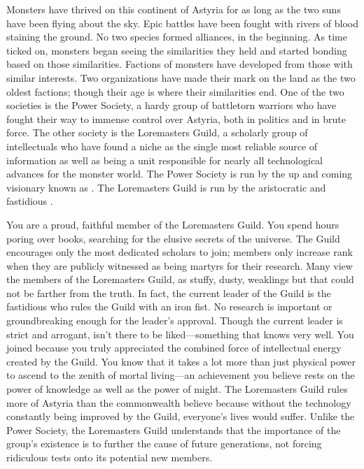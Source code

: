 \documentclass[blue]{guildcamp2}
\begin{document}
\name{\bLoremasters{}}



Monsters have thrived on this continent of Astyria for as long as the two suns have been flying about the sky. Epic battles have been fought with rivers of blood staining the ground. No two species formed alliances, in the beginning. As time ticked on, monsters began seeing the similarities they held and started bonding based on those similarities. Factions of monsters have developed from those with similar interests. Two organizations have made their mark on the land as the two oldest factions; though their age is where their similarities end. One of the two societies is the Power Society, a hardy group of battletorn warriors who have fought their way to immense control over Astyria, both in politics and in brute force. The other society is the Loremasters Guild, a scholarly group of intellectuals who have found a niche as the single most reliable source of information as well as being a unit responsible for nearly all technological advances for the monster world. The Power Society is run by the up and coming visionary known as \cRed{}. The Loremasters Guild is run by the aristocratic and fastidious \cVampire{\full}.

You are a proud, faithful member of the Loremasters Guild. You spend hours poring over books, searching for the elusive secrets of the universe. The Guild encourages only the most dedicated scholars to join; members only increase rank when they are publicly witnessed as being martyrs for their research. Many view the members of the Loremasters Guild, as stuffy, dusty, weaklings but that could not be farther from the truth. In fact, the current leader of the Guild is the fastidious \cVampire{\full} who rules the Guild with an iron fist. No research is important or groundbreaking enough for the leader's approval. Though the current leader is strict and arrogant, \cVampire{\they} isn't there to be liked---something that \cVampire{\they} knows very well. You joined because you truly appreciated the combined force of intellectual energy created by the Guild. You know that it takes a lot more than just physical power to ascend to the zenith of mortal living---an achievement you believe rests on the power of knowledge as well as the power of might. The Loremasters Guild rules more of Astyria than the commonwealth believe because without the technology constantly being improved by the Guild, everyone's lives would suffer. Unlike the Power Society, the Loremasters Guild understands that the importance of the group's existence is to further the cause of future generations, not forcing ridiculous tests onto its potential new members.
\end{document}
